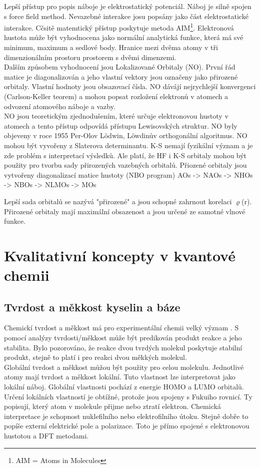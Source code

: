 \documentclass[
  digital, %
  table,   %
  lof,     %
  lot,     %
  oneside,
]{fithesis3}
\begin{document}
Lepší přístup pro popis náboje je elektrostatický potenciál. Náboj je silně spojen s force field method. Nevazebné interakce josu popsány jako část elektrostatické interakce. Cčsitě matemtický přístup poskytuje metoda AIM\footnote{AIM = Atoms in Molecules}. Elektronová hustota může být vyhodnocena jako normální analytická funkce, která má své minimum, maximum a sedlové body. Hranice mezi dvěma atomy v tři dimenzionálním prostoru prostorem s dvěmi dimenzemi. \\
Dalším způsobem vyhodnocení jsou Lokalizované Orbitaly (NO).  První řád matice je diagonalizován a jeho vlastní vektory jsou označeny jako přirozené orbitaly. Vlastní hodnoty jsou obsazovací čísla. NO dávájí nejrychlejší konvergenci (Carlson-Keller teorem) a mohou popsat rozložení elektronů v atomech a odvození atomového náboje a vazby.  \cite{jensen2007introduction} \\
 NO jsou teoretickým zjednodušením, které určuje elektronovou hustoty v atomech a  tento přístup odpovídá přístupu Lewisovských struktur. NO byly objeveny v roce 1955 Per-Olov Lödwin, Löwdinův orthogonální algoritmus. NO mohou být vyvořeny z Slaterova determinantu. K-S nemají fyzikální význam a je zde problém s interpretací výsledků. Ale platí, že HF i K-S orbitaly mohou být použity pro tvorbu sady přirozených vazebných orbitalů. Přiozené orbitaly jsou vytvořeny diagonalizací matice hustoty
(NBO program)
 AOs -> NAOs -> NHOs -> NBOs -> NLMOs -> MOs

Lepší sada orbitalů se nazývá "přirozené" a jsou schopné zahrnout korelaci $\varrho$(r). Přirozené orbitaly mají maximální obsazenost a jsou určené ze samotné vlnové funkce.

\section{Kvalitativní koncepty v kvantové chemii}
\subsection{Tvrdost a měkkost kyselin a báze}
Chemickí tvrdost a měkkost má pro experimentální chemii velký význam . S pomocí analýzy tvrdosti/měkkost může být predikován produkt reakce a jeho stabilita. Bylo pozorováno, že reakce dvou tvrdých molekul poskytuje stabilní produkt, stejně to platí i pro reakci dvou měkkých molekul. \\
Globální tvrdost a měkkost můžou být použity pro celou molekulu. Jednotlivé atomy mají tvrdost a měkkost lokální. Tuto vlastnost lze interpretovat jako lokální náboj. Globální vlastnosti pochází z energie HOMO a LUMO orbitalů. Určení lokálních vlastností je obtížné, protože jsou spojeny s Fukuiho rovnicí. Ty popisují, který atom v molekule přijme nebo ztratí elektron. Chemická interpretace je schopnost nuklefilního nebo elektrofilního útoku. Stejně dobře to popíše externí elektrické pole a polarizace. Toto je přímo spojené s elektronovou hustotou a DFT metodami.
\end{document}
